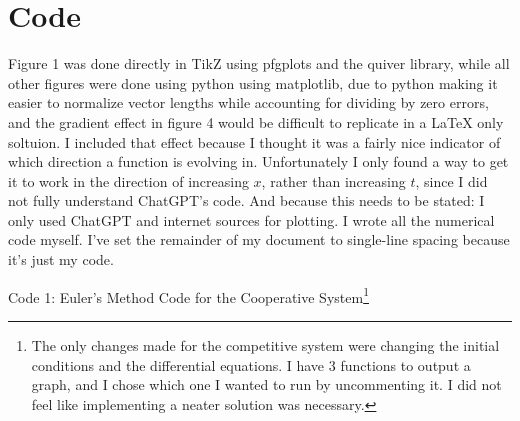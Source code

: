 \documentclass[11pt, letterpaper]{article}
\begin{document}
\section{Code}
Figure 1 was done directly in TikZ using pfgplots and the quiver library, while all other figures were done using python using matplotlib, due to python making it easier to normalize vector lengths while accounting for dividing by zero errors, and the gradient effect in figure 4 would be difficult to replicate in a LaTeX only soltuion. I included that effect because I thought it was a fairly nice indicator of which direction a function is evolving in. Unfortunately I only found a way to get it to work in the direction of increasing $x$, rather than increasing $t$, since I did not fully understand ChatGPT's code. And because this needs to be stated: I only used ChatGPT and internet sources for plotting. I wrote all the numerical code myself. I've set the remainder of my document to single-line spacing because it's just my code.
\singlespacing
\begin{center}
	Code 1: Euler's Method Code for the Cooperative System\footnote{The only changes made for the competitive system were changing the initial conditions and the differential equations. I have 3 functions to output a graph, and I chose which one I wanted to run by uncommenting it. I did not feel like implementing a neater solution was necessary.}
\end{center}
\end{document}

